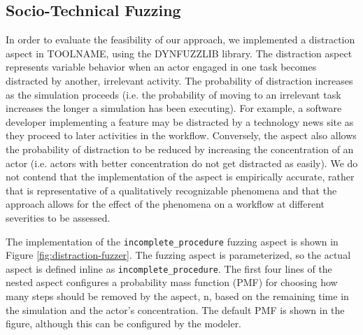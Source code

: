 \documentclass{llncs}
\begin{document}
\subsection{Socio-Technical Fuzzing}

In order to evaluate the feasibility of our approach, we implemented a distraction aspect in TOOLNAME, using the
DYNFUZZLIB library.  The distraction aspect represents variable behavior when an actor engaged in one task becomes
distracted by another, irrelevant activity.  The probability of distraction increases as the simulation proceeds
(i.e. the probability of moving to an irrelevant task increases the longer a simulation has been executing).  For
example, a software developer implementing a feature may be distracted by a technology news site as they proceed to
later activities in the workflow.  Conversely, the aspect also allows the probability of distraction to be reduced by
increasing the concentration of an actor (i.e. actors with better concentration do not get distracted as easily).  We do
not contend that the implementation of the aspect is empirically accurate, rather that is representative of a
qualitatively recognizable phenomena and that the approach allows for the effect of the phenomena on a workflow at
different severities to be assessed.

The implementation of the \lstinline!incomplete_procedure! fuzzing aspect is shown in Figure
\ref{fig:distraction-fuzzer}.  The fuzzing aspect is parameterized, so the actual aspect is defined inline as
\lstinline!incomplete_procedure!.  The first four lines of the nested aspect configures a probability mass function
(PMF) for choosing how many steps should be removed by the aspect, n, based on the remaining time in the simulation and
the actor’s concentration. The default PMF is shown in the figure, although this can be configured by the modeler.
\end{document}

